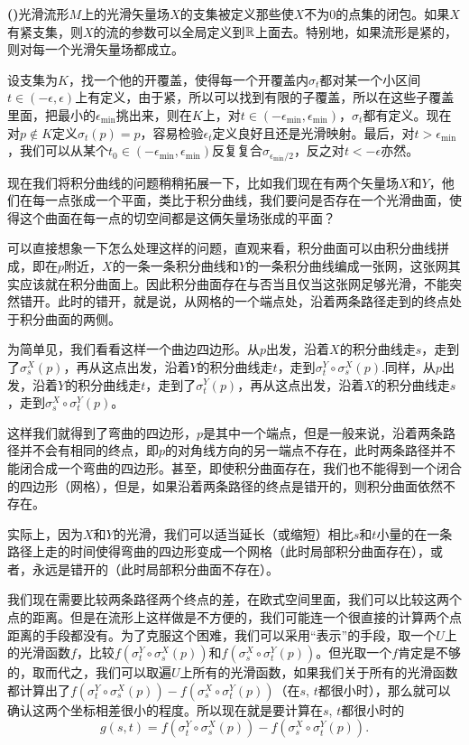 \documentclass[9pt]{extbook}
\newcommand{\paracount}[1]{\refstepcounter{para}\textbf{#1 (\thepara)}}
\renewcommand{\para}{\paracount{}}
\begin{document}
\para 光滑流形$M$上的光滑矢量场$X$的支集被定义那些使$X$不为$0$的点集的闭包。如果$X$有紧支集，则$X$的流的参数可以全局定义到$\mathbb{R}$上面去。特别地，如果流形是紧的，则对每一个光滑矢量场都成立。

设支集为$K$，找一个他的开覆盖，使得每一个开覆盖内$\sigma_t$都对某一个小区间$t\in (-\epsilon,\epsilon)$上有定义，由于紧，所以可以找到有限的子覆盖，所以在这些子覆盖里面，把最小的$\epsilon_{\text{min}}$挑出来，则在$K$上，对$t\in(-\epsilon_{\text{min}},\epsilon_{\text{min}})$，$\sigma_t$都有定义。现在对$p\notin K$定义$\sigma_t(p)=p$，容易检验$\epsilon_t$定义良好且还是光滑映射。最后，对$t>\epsilon_{\text{min}}$，我们可以从某个$t_0\in (-\epsilon_{\text{min}},\epsilon_{\text{min}})$反复复合$\sigma_{\epsilon_{\text{min}}/2}$，反之对$t<-\epsilon$亦然。

现在我们将积分曲线的问题稍稍拓展一下，比如我们现在有两个矢量场$X$和$Y$，他们在每一点张成一个平面，类比于积分曲线，我们要问是否存在一个光滑曲面，使得这个曲面在每一点的切空间都是这俩矢量场张成的平面？

可以直接想象一下怎么处理这样的问题，直观来看，积分曲面可以由积分曲线拼成，即在$p$附近，$X$的一条一条积分曲线和$Y$的一条积分曲线编成一张网，这张网其实应该就在积分曲面上。因此积分曲面存在与否当且仅当这张网足够光滑，不能突然错开。此时的错开，就是说，从网格的一个端点处，沿着两条路径走到的终点处于积分曲面的两侧。

为简单见，我们看看这样一个曲边四边形。从$p$出发，沿着$X$的积分曲线走$s$，走到了$\sigma^X_s(p)$，再从这点出发，沿着$Y$的积分曲线走$t$，走到$\sigma^Y_t\circ\sigma^X_s(p)$.同样，从$p$出发，沿着$Y$的积分曲线走$t$，走到了$\sigma^Y_t(p)$，再从这点出发，沿着$X$的积分曲线走$s$，走到$\sigma^X_s\circ\sigma^Y_t(p)$。

这样我们就得到了弯曲的四边形，$p$是其中一个端点，但是一般来说，沿着两条路径并不会有相同的终点，即$p$的对角线方向的另一端点不存在，此时两条路径并不能闭合成一个弯曲的四边形。甚至，即使积分曲面存在，我们也不能得到一个闭合的四边形（网格），但是，如果沿着两条路径的终点是错开的，则积分曲面依然不存在。

实际上，因为$X$和$Y$的光滑，我们可以适当延长（或缩短）相比$s$和$t$小量的在一条路径上走的时间使得弯曲的四边形变成一个网格（此时局部积分曲面存在），或者，永远是错开的（此时局部积分曲面不存在）。

我们现在需要比较两条路径两个终点的差，在欧式空间里面，我们可以比较这两个点的距离。但是在流形上这样做是不方便的，我们可能连一个很直接的计算两个点距离的手段都没有。为了克服这个困难，我们可以采用“表示”的手段，取一个$U$上的光滑函数$f$，比较$f(\sigma^Y_t\circ\sigma^X_s(p))$和$f(\sigma^X_s\circ\sigma^Y_t(p))$。但光取一个$f$肯定是不够的，取而代之，我们可以取遍$U$上所有的光滑函数，如果我们关于所有的光滑函数都计算出了$f(\sigma^Y_t\circ\sigma^X_s(p))-f(\sigma^X_s\circ\sigma^Y_t(p))$（在$s$, $t$都很小时），那么就可以确认这两个坐标相差很小的程度。所以现在就是要计算在$s$, $t$都很小时的
\[
	g(s,t)=f(\sigma^Y_t\circ\sigma^X_s(p))-f(\sigma^X_s\circ\sigma^Y_t(p)).
\]
\end{document}
